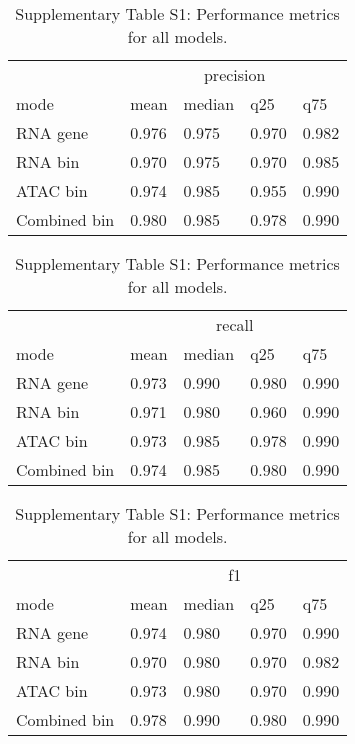 \begin{table}[ht]
\centering
\begin{subtable}[t]{\linewidth}
\centering
\vspace{0pt}
\begin{table}[!h]
\centering
\begin{tabular}{lllll}
\toprule
\multicolumn{1}{c}{ } & \multicolumn{4}{c}{precision} \\
\cmidrule(l{3pt}r{3pt}){2-5}
mode & mean & median & q25 & q75\\
\midrule
RNA gene & 0.976 & 0.975 & 0.970 & 0.982\\
RNA bin & 0.970 & 0.975 & 0.970 & 0.985\\
ATAC bin & 0.974 & 0.985 & 0.955 & 0.990\\
Combined bin & 0.980 & 0.985 & 0.978 & 0.990\\
\bottomrule
\end{tabular}
\end{table}
\caption{Panel A: precision metrics}
\end{subtable}

\begin{subtable}[t]{\linewidth}
\centering
\vspace{0pt}
\begin{table}[!h]
\centering
\begin{tabular}{lllll}
\toprule
\multicolumn{1}{c}{ } & \multicolumn{4}{c}{recall} \\
\cmidrule(l{3pt}r{3pt}){2-5}
mode & mean & median & q25 & q75\\
\midrule
RNA gene & 0.973 & 0.990 & 0.980 & 0.990\\
RNA bin & 0.971 & 0.980 & 0.960 & 0.990\\
ATAC bin & 0.973 & 0.985 & 0.978 & 0.990\\
Combined bin & 0.974 & 0.985 & 0.980 & 0.990\\
\bottomrule
\end{tabular}
\end{table}
\caption{Panel B: recall metrics}
\end{subtable}

\begin{subtable}[t]{\linewidth}
\centering
\vspace{0pt}
\begin{table}[!h]
\centering
\begin{tabular}{lllll}
\toprule
\multicolumn{1}{c}{ } & \multicolumn{4}{c}{f1} \\
\cmidrule(l{3pt}r{3pt}){2-5}
mode & mean & median & q25 & q75\\
\midrule
RNA gene & 0.974 & 0.980 & 0.970 & 0.990\\
RNA bin & 0.970 & 0.980 & 0.970 & 0.982\\
ATAC bin & 0.973 & 0.980 & 0.970 & 0.990\\
Combined bin & 0.978 & 0.990 & 0.980 & 0.990\\
\bottomrule
\end{tabular}
\end{table}
\caption{Panel C: f1 metrics}
\end{subtable}

\caption{Supplementary Table S1: Performance metrics for all models.}
\label{supp:performance}
\end{table}
